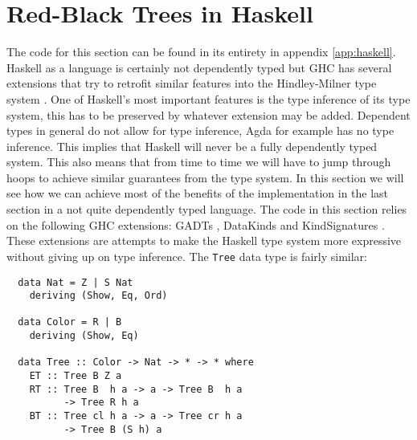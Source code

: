 \documentclass[journal, retainorgcmds]{IEEEtran}
\newcommand{\ihask}[1]{\texttt{#1}}
\begin{document}
\section{Red-Black Trees in Haskell}

The code for this section can be found in its entirety in appendix
\ref{app:haskell}.
Haskell as a language is certainly not dependently typed but GHC \cite{ghc} has
several extensions that try to retrofit similar features into the
Hindley-Milner type system \cite{hindley}.
One of Haskell's most important features is the type inference of its type
system, this has to be preserved by whatever extension may be added.
Dependent types in general do not allow for type inference, Agda for example
has no type inference.
This implies that Haskell will never be a fully dependently typed system.
This also means that from time to time we will have to jump through hoops to
achieve similar guarantees from the type system.
In this section we will see how we can achieve most of the benefits of the
implementation in the last section in a not quite dependently typed language.
The code in this section relies on the following GHC extensions: GADTs
\cite{gadts}, DataKinds \cite{datakinds} and KindSignatures
\cite{kindsigs}.
These extensions are attempts to make the Haskell type system more expressive
without giving up on type inference.
The \ihask{Tree} data type is fairly similar:

\begin{verbatim}
  data Nat = Z | S Nat
    deriving (Show, Eq, Ord)

  data Color = R | B
    deriving (Show, Eq)

  data Tree :: Color -> Nat -> * -> * where
    ET :: Tree B Z a
    RT :: Tree B  h a -> a -> Tree B  h a
          -> Tree R h a
    BT :: Tree cl h a -> a -> Tree cr h a
          -> Tree B (S h) a
\end{verbatim}
\end{document}
